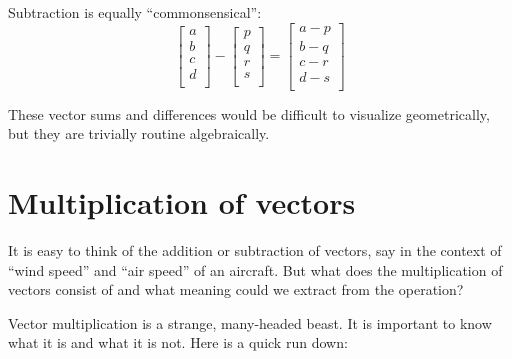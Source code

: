 \documentclass[
  a4paper,
]{article}
\begin{document}
Subtraction is equally ``commonsensical'': \[
\begin{bmatrix}a\\b\\c\\d\\\end{bmatrix} - \begin{bmatrix}p\\q\\r\\s\\\end{bmatrix} = \begin{bmatrix}a-p\\b-q\\c-r\\d-s\\\end{bmatrix}
\]

These vector sums and differences would be difficult to visualize
geometrically, but they are trivially routine algebraically.

\hypertarget{multiplication-of-vectors}{%
\section{Multiplication of vectors}\label{multiplication-of-vectors}}

It is easy to think of the addition or subtraction of vectors, say in
the context of ``wind speed'' and ``air speed'' of an aircraft. But what
does the multiplication of vectors consist of and what meaning could we
extract from the operation?

Vector multiplication is a strange, many-headed beast. It is important
to know what it is and what it is not. Here is a quick run down:
\end{document}
